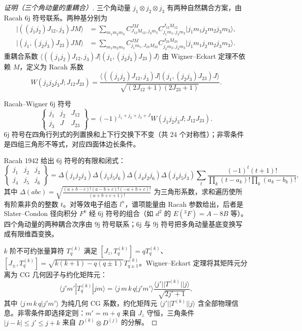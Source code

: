 \begin{proof}[证明（三个角动量的重耦合）]
三个角动量 \(j_1\otimes j_2\otimes j_3\) 有两种自然耦合方案，由 Racah 6j 符号联系。两种基分别为
\begin{align*}
  |((j_1j_2)J_{12},j_3)JM\rangle&=\sum_{m_1m_2m_3}C^{JM}_{J_{12}M_{12},j_3m_3}C^{J_{12}M_{12}}_{j_1m_1,j_2m_2}|j_1m_1j_2m_2j_3m_3\rangle,\\
  |(j_1,(j_2j_3)J_{23})JM\rangle&=\sum_{m_1m_2m_3}C^{JM}_{j_1m_1,J_{23}M_{23}}C^{J_{23}M_{23}}_{j_2m_2,j_3m_3}|j_1m_1j_2m_2j_3m_3\rangle.
\end{align*}
重耦合系数 \(\langle((j_1j_2)J_{12},j_3)J|(j_1,(j_2j_3)J_{23})J\rangle\) 由 Wigner--Eckart 定理不依赖 \(M\)，定义为 Racah 系数
\begin{equation*}
  W(j_1j_2j_3J;J_{12}J_{23})=\frac{\langle((j_1j_2)J_{12},j_3)J|(j_1,(j_2j_3)J_{23})J\rangle}{\sqrt{(2J_{12}+1)(2J_{23}+1)}}.
\end{equation*}

Racah--Wigner 6j 符号
\begin{equation*}
  \begin{Bmatrix}j_1&j_2&J_{12}\\j_3&J&J_{23}\end{Bmatrix}=(-1)^{j_1+j_2+j_3+J}W(j_1j_2j_3J;J_{12}J_{23}).
\end{equation*}
6j 符号在四角行列式的列置换和上下行交换下不变（共 24 个对称性）；非零条件是四组三角形不等式，对应四面体边长条件。

Racah 1942 给出 6j 符号的有限和闭式：
\begin{equation*}
  \begin{Bmatrix}j_1&j_2&j_3\\j_4&j_5&j_6\end{Bmatrix}=\Delta(j_1j_2j_3)\Delta(j_1j_5j_6)\Delta(j_4j_2j_6)\Delta(j_4j_5j_3)\sum_t\frac{(-1)^t(t+1)!}{\prod_k(t-a_k)!\prod_k(a_k-b_k)!},
\end{equation*}
其中 \(\Delta(abc)=\sqrt{\frac{(a+b-c)!(a-b+c)!(-a+b+c)!}{(a+b+c+1)!}}\) 为三角形系数，求和遍历使所有阶乘非负的整数 \(t\)。对等效电子组态 \(l^n\)，谱项能量由 Racah 参数给出，后者是 Slater--Condon 径向积分 \(F^k\) 经 6j 符号的组合（如 \(d^2\) 的 \(E(^3F)=A-8B\) 等）。四个角动量的两种耦合次序由 9j 符号联系；6j 与 9j 符号把多角动量基底变换写成有限维酉变换。

\(k\) 阶不可约张量算符 \(T^{(k)}_q\) 满足 \([J_z,T^{(k)}_q]=qT^{(k)}_q\)、\([J_\pm,T^{(k)}_q]=\sqrt{k(k+1)-q(q\pm1)}T^{(k)}_{q\pm1}\)。Wigner--Eckart 定理将其矩阵元分离为 CG 几何因子与约化矩阵元：
\begin{equation}
  \langle j'm'|T^{(k)}_q|jm\rangle=\langle j\,m\,k\,q|j'm'\rangle\frac{\langle j'||T^{(k)}||j\rangle}{\sqrt{2j'+1}},
  \label{eq:phys-am-wigner-eckart}
\end{equation}
其中 \(\langle j\,m\,k\,q|j'm'\rangle\) 为纯几何 CG 系数，约化矩阵元 \(\langle j'||T^{(k)}||j\rangle\) 含全部物理信息。非零条件即选择定则：\(m'=m+q\) 来自 \(J_z\) 守恒，三角条件 \(|j-k|\le j'\le j+k\) 来自 \(D^{(k)}\otimes D^{(j)}\) 的分解。
\end{proof}
